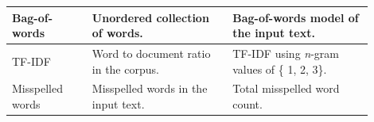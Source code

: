 \clearpage
\singlespacing
\begingroup
  \fontsize{10pt}{12pt}\selectfont
    \tablelasttail{\\ \hline}
    \label{tab::Features}
    \begin{xtabular}{|p{0.20\linewidth}|p{0.35\linewidth}|p{0.35\linewidth}|}
      Bag-of-words & Unordered collection of words. & Bag-of-words model of the input text. \\
      \hline
      TF-IDF & Word to document ratio in the corpus. & TF-IDF using \textit{n}-gram values of \{ 1, 2, 3\}. \\
      \hline
      Misspelled words & Misspelled words in the input text. & Total misspelled word count. \\
      \hline


\end{xtabular}
